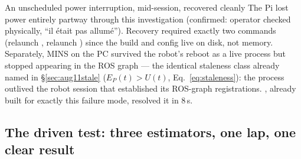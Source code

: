 \begin{trapbox}{An unscheduled power interruption, mid-session, recovered cleanly}
The Pi lost power entirely partway through this investigation (confirmed:
operator checked physically, ``il était pas allumé''). Recovery required
exactly two commands (relaunch , relaunch
) since the build and config live on disk, not memory.
Separately, MINS on the PC survived the robot's reboot as a live process
but stopped appearing in the ROS graph --- the identical staleness class
already named in \S\ref{sec:aug11stale}
($E_P(t) > U(t)$, Eq.~\ref{eq:staleness}): the process outlived the robot
session that established its ROS-graph registrations. ,
already built for exactly this failure mode, resolved it in $8$\,s.
\end{trapbox}

\subsection{The driven test: three estimators, one lap, one clear result}


